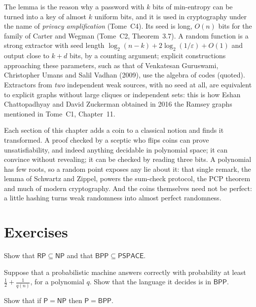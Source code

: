 The lemma is the reason why a password with $k$ bits of min-entropy can be turned into a key of almost $k$ uniform bits, and it is used in cryptography under the name of \emph{privacy amplification} (Tome~C4). Its seed is long, $O(n)$ bits for the family of Carter and Wegman (Tome~C2, Theorem~3.7). A random function is a strong extractor with seed length $\log_2(n-k)+2\log_2(1/\varepsilon)+O(1)$ and output close to $k+d$ bits, by a counting argument; explicit constructions approaching these parameters, such as that of Venkatesan Guruswami, Christopher Umans and Salil Vadhan (2009), use the algebra of codes (quoted). Extractors from \emph{two} independent weak sources, with no seed at all, are equivalent to explicit graphs without large cliques or independent sets: this is how Eshan Chattopadhyay and David Zuckerman obtained in 2016 the Ramsey graphs mentioned in Tome~C1, Chapter~11.

\begin{beauty}
Each section of this chapter adds a coin to a classical notion and finds it transformed. A proof checked by a sceptic who flips coins can prove unsatisfiability, and indeed anything decidable in polynomial space; it can convince without revealing; it can be checked by reading three bits. A polynomial has few roots, so a random point exposes any lie about it: that single remark, the lemma of Schwartz and Zippel, powers the sum-check protocol, the PCP theorem and much of modern cryptography. And the coins themselves need not be perfect: a little hashing turns weak randomness into almost perfect randomness.
\end{beauty}

\section{Exercises}

\begin{exercise}[$\star$]\label{ex:rpnp}
Show that $\mathsf{RP}\subseteq\mathsf{NP}$ and that $\mathsf{BPP}\subseteq\mathsf{PSPACE}$.
\end{exercise}

\begin{exercise}[$\star\star$]\label{ex:weakbpp}
Suppose that a probabilistic machine answers correctly with probability at least $\frac12+\frac1{q(n)}$, for a polynomial $q$. Show that the language it decides is in $\mathsf{BPP}$.
\end{exercise}

\begin{exercise}[$\star$]\label{ex:pnpbpp}
Show that if $\mathsf P=\mathsf{NP}$ then $\mathsf P=\mathsf{BPP}$.
\end{exercise}

